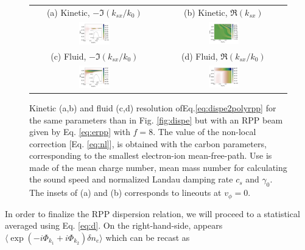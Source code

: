 \documentclass[
 reprint,
 amsmath,amssymb,
 aps,
]{revtex4-1}
\begin{document}
\begin{figure}
\begin{tabular}{cc}
(a) Kinetic, $-\Im(k_{sx}/k_0)$ &
(b)  Kinetic, $\Re(k_{sx})$ \\
\includegraphics[width=0.25\textwidth]{Grpp_CH_new.png}&
\includegraphics[width=0.25\textwidth]{krpp_CH.png}\\
(c) Fluid, $-\Im(k_{sx}/k_0)$  &
(d) Fluid, $\Re(k_{sx}/k_0)$  \\
\includegraphics[width=0.25\textwidth]{Gfrpp_CH_new.png}&
\includegraphics[width=0.25\textwidth]{kfrpp_CH.png}
\end{tabular}
\caption{ \label{fig:dispeCHrpp}  
Kinetic (a,b) and fluid (c,d) resolution ofEq.\eqref{eq:dispe2polyrpp} for  the same parameters than in Fig. \ref{fig:dispe} but with an RPP beam given by Eq. \eqref{eq:erpp} with $f=8$.  The value of the non-local correction [Eq. \eqref{eq:nl}], is obtained with the carbon parameters, corresponding to the smallest electron-ion mean-free-path. Use is made of the mean charge number, mean mass number   for calculating the sound speed and normalized Landau damping rate $c_s$ and $\gamma_0$.
The insets  of (a) and (b) corresponds to lineouts at $v_\phi=0$. 
 }
\end{figure}
In order to finalize the RPP dispersion relation, we will proceed to a statistical averaged using Eq. \eqref{eq:d}. On the right-hand-side, appears $\langle\exp(-i\Phi_{k_1}+i\Phi_{k_2})\delta n_e \rangle$ which can be recast as
\end{document}
